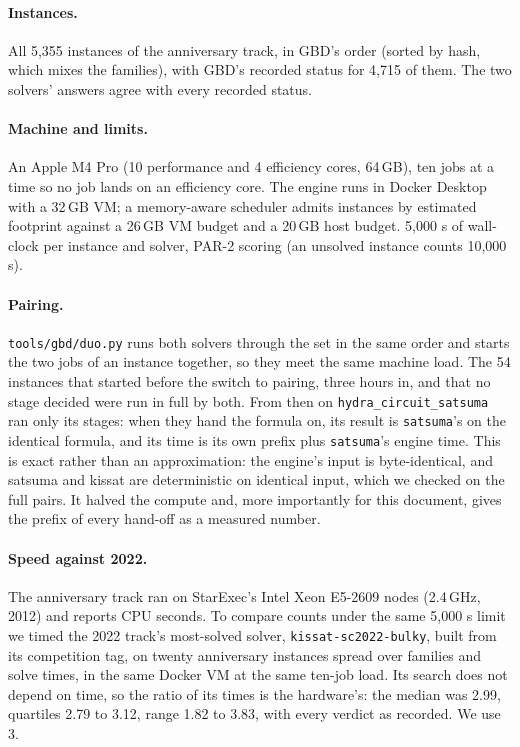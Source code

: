 \documentclass[10pt]{article}
\newcommand{\hcs}{\texttt{hydra\_circuit\_satsuma}}
\newcommand{\sats}{\texttt{satsuma}}
\newcommand{\partwo}{PAR-2}
\begin{document}
\paragraph{Instances.} All 5,355 instances of the anniversary track, in
GBD's order (sorted by hash, which mixes the families), with GBD's recorded
status for 4,715 of them. The two solvers' answers agree with every
recorded status.

\paragraph{Machine and limits.} An Apple M4 Pro (10 performance and 4
efficiency cores, 64\,GB), ten jobs at a time so no job lands on an
efficiency core. The engine runs in Docker Desktop with a 32\,GB VM; a
memory-aware scheduler admits instances by estimated footprint against a
26\,GB VM budget and a 20\,GB host budget. 5,000 s of wall-clock per
instance and solver, \partwo{} scoring (an unsolved instance counts
10,000 s).

\paragraph{Pairing.} \texttt{tools/gbd/duo.py} runs both solvers through
the set in the same order and starts the two jobs of an instance together,
so they meet the same machine load. The 54 instances that started before
the switch to pairing, three hours in, and that no stage decided were run
in full by both. From then on \hcs{} ran only its stages: when they hand the
formula on, its result is \sats{}'s on the identical formula, and its time
is its own prefix plus \sats{}'s engine time. This is exact rather than an
approximation: the engine's input is byte-identical, and satsuma and
kissat are deterministic on identical input, which we checked on the full
pairs. It halved the compute and, more importantly for this document,
gives the prefix of every hand-off as a measured number.

\paragraph{Speed against 2022.} The anniversary track ran on StarExec's
Intel Xeon E5-2609 nodes (2.4\,GHz, 2012) and reports CPU seconds. To
compare counts under the same 5,000 s limit we timed the 2022 track's
most-solved solver, \texttt{kissat-sc2022-bulky}, built from its
competition tag, on twenty anniversary instances spread over families and
solve times, in the same Docker VM at the same ten-job load. Its search
does not depend on time, so the ratio of its times is the hardware's: the
median was 2.99, quartiles 2.79 to 3.12, range 1.82 to 3.83, with every
verdict as recorded. We use 3.
\end{document}
